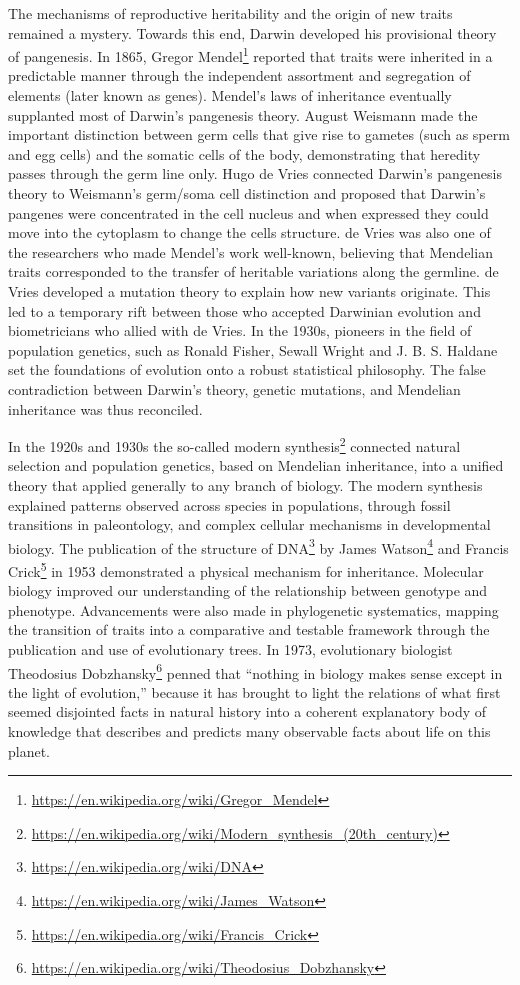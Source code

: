 \documentclass[]{book}
\let\rmarkdownfootnote\footnote%
\def\footnote{\protect\rmarkdownfootnote}
\renewcommand{\href}[2]{#2\footnote{\url{#1}}}
\theoremstyle{definition}
\theoremstyle{definition}
\theoremstyle{definition}
\theoremstyle{remark}
\begin{document}
\begin{enumerate}
The mechanisms of reproductive heritability and the origin of new traits
remained a mystery. Towards this end, Darwin developed his provisional
theory of pangenesis. In 1865, \href{https://en.wikipedia.org/wiki/Gregor_Mendel}{Gregor Mendel} reported that traits were
inherited in a predictable manner through the independent assortment and
segregation of elements (later known as genes). Mendel's laws of
inheritance eventually supplanted most of Darwin's pangenesis theory.
August Weismann made the important distinction between germ cells that
give rise to gametes (such as sperm and egg cells) and the somatic cells
of the body, demonstrating that heredity passes through the germ line
only. Hugo de Vries connected Darwin's pangenesis theory to Weismann's
germ/soma cell distinction and proposed that Darwin's pangenes were
concentrated in the cell nucleus and when expressed they could move into
the cytoplasm to change the cells structure. de Vries was also one of
the researchers who made Mendel's work well-known, believing that
Mendelian traits corresponded to the transfer of heritable variations
along the germline. de Vries developed a mutation theory to explain how
new variants originate. This led to a temporary rift between those who
accepted Darwinian evolution and biometricians who allied with de Vries.
In the 1930s, pioneers in the field of population genetics, such as
Ronald Fisher, Sewall Wright and J. B. S. Haldane set the foundations of
evolution onto a robust statistical philosophy. The false contradiction
between Darwin's theory, genetic mutations, and Mendelian inheritance
was thus reconciled.

In the 1920s and 1930s the so-called
\href{https://en.wikipedia.org/wiki/Modern_synthesis_(20th_century)}{modern
synthesis} connected natural selection and population genetics, based on
Mendelian inheritance, into a unified theory that applied generally to
any branch of biology. The modern synthesis explained patterns observed
across species in populations, through fossil transitions in
paleontology, and complex cellular mechanisms in developmental biology.
The publication of the structure of
\href{https://en.wikipedia.org/wiki/DNA}{DNA} by
\href{https://en.wikipedia.org/wiki/James_Watson}{James Watson} and
\href{https://en.wikipedia.org/wiki/Francis_Crick}{Francis Crick} in
1953 demonstrated a physical mechanism for inheritance. Molecular
biology improved our understanding of the relationship between genotype
and phenotype. Advancements were also made in phylogenetic systematics,
mapping the transition of traits into a comparative and testable
framework through the publication and use of evolutionary trees. In
1973, evolutionary biologist
\href{https://en.wikipedia.org/wiki/Theodosius_Dobzhansky}{Theodosius
Dobzhansky} penned that ``nothing in biology makes sense except in the
light of evolution,'' because it has brought to light the relations of
what first seemed disjointed facts in natural history into a coherent
explanatory body of knowledge that describes and predicts many
observable facts about life on this planet.


\end{enumerate}
\end{document}
